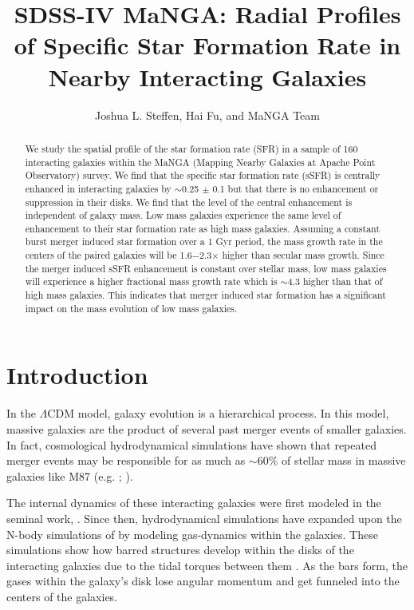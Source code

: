 \documentclass[iop,revtex4,twocolumn,apj,numberedappendix,appendixfloats]{emulateapj}
\begin{document}
\title{SDSS-IV MaNGA: Radial Profiles of Specific Star Formation Rate in Nearby Interacting Galaxies}

\author{
Joshua L. Steffen, 
Hai Fu, and 
MaNGA Team 
}

\begin{abstract}
We study the spatial profile of the star formation rate (SFR) in a sample of 160 interacting galaxies within the MaNGA (Mapping Nearby Galaxies at Apache Point Observatory) survey. We find that the specific star formation rate (sSFR) is centrally enhanced in interacting galaxies by $\sim$0.25 $\pm$ 0.1 but that there is no enhancement or suppression in their disks. We find that the level of the central enhancement is independent of galaxy mass. Low mass galaxies experience the same level of enhancement to their star formation rate as high mass galaxies. Assuming a constant burst merger induced star formation over a 1 Gyr period, the mass growth rate in the centers of the paired galaxies will be 1.6$-$2.3$\times$ higher than secular mass growth. Since the merger induced sSFR enhancement is constant over stellar mass, low mass galaxies will experience a higher fractional mass growth rate which is $\sim$4.3 higher than that of high mass galaxies. This indicates that merger induced star formation has a significant impact on the mass evolution of low mass galaxies. 

\end{abstract}


\section{Introduction}\label{sec:intro}

In the $\Lambda$CDM model, galaxy evolution is a hierarchical process. In this model, massive galaxies are the product of several past merger events of smaller galaxies. In fact, cosmological hydrodynamical simulations have shown that repeated merger events may be responsible for as much as $\sim$60\% of stellar mass in massive galaxies like M87 (e.g. \citet{Rodriguez-Gomez:2016}; \citet{Pillepich:2018}). 

The internal dynamics of these interacting galaxies were first modeled in the seminal work, \citet{Toomre:1972}. Since then, hydrodynamical simulations have expanded upon the N-body simulations of \citet{Toomre:1972} by modeling gas-dynamics within the galaxies. These simulations show how barred structures develop within the disks of the interacting galaxies due to the tidal torques between them \citep{Barnes:1991}. As the bars form, the gases within the galaxy's disk lose angular momentum and get funneled into the centers of the galaxies. 
\end{document}

